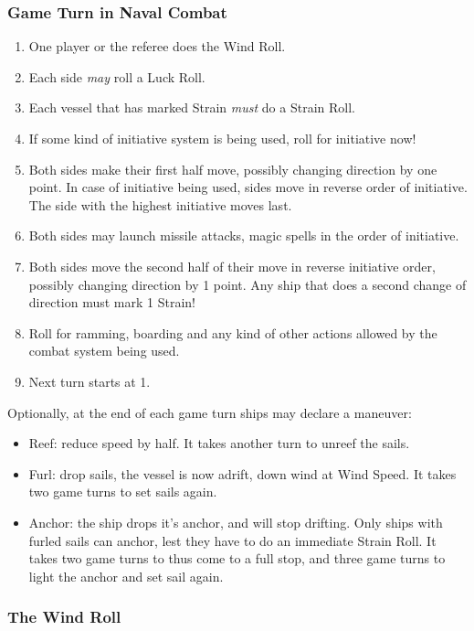 \documentclass[11pt]{wbzine}
\begin{document}
\begin{multicols}{2}
\subsubsection{Game Turn in Naval Combat}

\begin{enumerate}
\item
  One player or the referee does the Wind Roll.
\item
  Each side \emph{may} roll a Luck Roll.
\item
  Each vessel that has marked Strain \emph{must} do a Strain Roll.
\item
  If some kind of initiative system is being used, roll for initiative
  now!
\item
  Both sides make their first half move, possibly changing direction by
  one point. In case of initiative being used, sides move in reverse
  order of initiative. The side with the highest initiative moves last.
\item
  Both sides may launch missile attacks, magic spells in the order of
  initiative.
\item
  Both sides move the second half of their move in reverse initiative
  order, possibly changing direction by 1 point. Any ship that does a
  second change of direction must mark 1 Strain!
\item
  Roll for ramming, boarding and any kind of other actions allowed by
  the combat system being used.
\item
  Next turn starts at 1.
\end{enumerate}

Optionally, at the end of each game turn ships may declare a maneuver:

\begin{itemize}
\item
  Reef: reduce speed by half. It takes another turn to unreef the sails.
\item
  Furl: drop sails, the vessel is now adrift, down wind at Wind Speed.
  It takes two game turns to set sails again.
\item
  Anchor: the ship drops it's anchor, and will stop drifting. Only ships
  with furled sails can anchor, lest they have to do an immediate Strain
  Roll. It takes two game turns to thus come to a full stop, and three
  game turns to light the anchor and set sail again.
\end{itemize}

\subsubsection{The Wind Roll}


\end{multicols}
\end{document}
